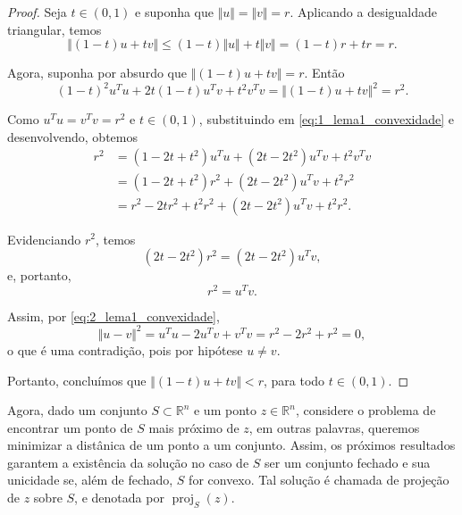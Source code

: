 \documentclass[12pt,a4paper]{scrartcl}
\DeclareMathOperator{\proj}{proj}
\def\RR{\mathds{R}}
\theoremstyle{definition}%
\begin{document}
\begin{proof}
Seja $t \in (0,1)$ e suponha que $\Vert u \Vert = \Vert v \Vert = r$. Aplicando a desigualdade triangular, temos
\[
\Vert (1-t)u + tv \Vert \leq (1-t)\Vert u \Vert + t\Vert v \Vert = (1-t)r + tr = r.
\]

Agora, suponha por absurdo que $\Vert (1-t)u + tv \Vert = r$. Então
\[ \label{eq:1_lema1_convexidade}
(1-t)^{2} u^{T}u + 2t(1-t)u^{T}v + t^{2}v^{T}v = \Vert (1-t)u + tv \Vert^{2} = r^{2}.
\]

Como $u^{T}u = v^{T}v = r^{2}$ e $t \in (0,1)$, substituindo em \eqref{eq:1_lema1_convexidade} e desenvolvendo, obtemos 
\begin{align}
r^{2} &= (1-2t+t^{2}) u^{T}u + (2t-2t^{2})u^{T}v + t^{2}v^{T}v \\
&= (1-2t+t^{2}) r^{2} + (2t-2t^{2})u^{T}v + t^{2}r^{2} \\
&= r^{2} - 2tr^{2} + t^{2}r^{2} + (2t-2t^{2})u^{T}v + t^{2}r^{2} .
\end{align}

Evidenciando $r^{2}$, temos
\[ 
(2t-2t^{2})r^{2} = (2t-2t^{2})u^{T}v,
\]
e, portanto,
\[ \label{eq:2_lema1_convexidade}
r^{2} = u^{T}v.
\]

Assim, por \eqref{eq:2_lema1_convexidade},
\[
\Vert u-v \Vert^{2} = u^{T}u - 2u^{T}v + v^{T}v = r^{2} - 2r^{2} + r^{2} = 0,
\]
o que é uma contradição, pois por hipótese $u \neq v$. 

Portanto, concluímos que $\Vert (1-t)u + tv \Vert < r$, para todo $t \in (0,1)$.
\end{proof}

Agora, dado um conjunto $S \subset \RR^{n}$ e um ponto $z \in \RR^{n}$, considere o problema de encontrar um ponto de $S$ mais próximo de $z$, em outras palavras, queremos minimizar a distânica de um ponto a um conjunto. Assim, os próximos resultados garantem a existência da solução no caso de $S$ ser um conjunto fechado e sua unicidade se, além de fechado, $S$ for convexo. Tal solução é chamada de projeção de $z$ sobre $S$, e denotada por $\proj_{S} (z)$. 
\end{document}
